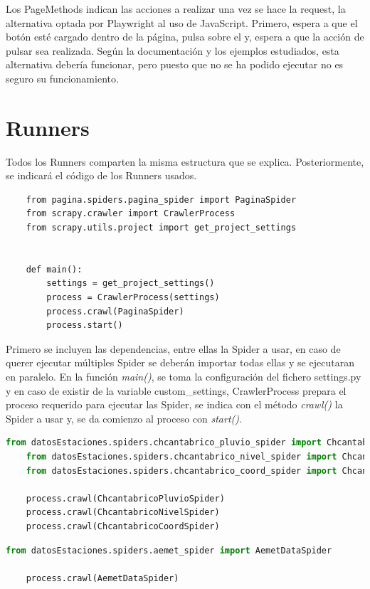 Los PageMethods indican las acciones a realizar una vez se hace la request, la alternativa optada por Playwright al uso de JavaScript. Primero, espera a que el botón esté cargado dentro de la página, pulsa sobre el y, espera a que la acción de pulsar sea realizada.\newline
\newline
Según la documentación y los ejemplos estudiados, esta alternativa debería funcionar, pero puesto que no se ha podido ejecutar no es seguro su funcionamiento.

\section{Runners}
Todos los Runners comparten la misma estructura que se explica. Posteriormente, se indicará el código de los Runners usados.

\begin{lstlisting}
	from pagina.spiders.pagina_spider import PaginaSpider
	from scrapy.crawler import CrawlerProcess
	from scrapy.utils.project import get_project_settings
	
	
	def main():
		settings = get_project_settings()
		process = CrawlerProcess(settings)
		process.crawl(PaginaSpider)
		process.start()
\end{lstlisting}

Primero se incluyen las dependencias, entre ellas la Spider a usar, en caso de querer ejecutar múltiples Spider se deberán importar todas ellas y se ejecutaran en paralelo. En la función \textit{main()}, se toma la configuración del fichero settings.py y en caso de existir de la variable custom\_settings, CrawlerProcess prepara el proceso requerido para ejecutar las Spider, se indica con el método \textit{crawl()} la Spider a usar y, se da comienzo al proceso con \textit{start()}.

\begin{lstlisting}[language=Python, caption={CHCantábrico Data Runner}]
	from datosEstaciones.spiders.chcantabrico_pluvio_spider import ChcantabricoPluvioSpider
	from datosEstaciones.spiders.chcantabrico_nivel_spider import ChcantabricoNivelSpider
	from datosEstaciones.spiders.chcantabrico_coord_spider import ChcantabricoCoordSpider

	process.crawl(ChcantabricoPluvioSpider)
	process.crawl(ChcantabricoNivelSpider)
	process.crawl(ChcantabricoCoordSpider)
\end{lstlisting}

\begin{lstlisting}[language=Python, caption={Aemet Data Runner}]
	from datosEstaciones.spiders.aemet_spider import AemetDataSpider

	process.crawl(AemetDataSpider)
\end{lstlisting}

